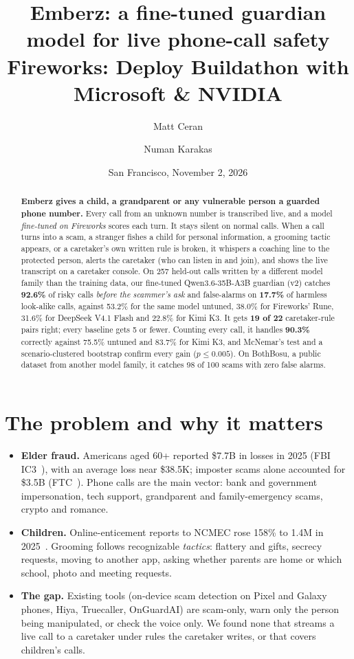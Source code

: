 \documentclass[11pt]{article}
\title{\textbf{Emberz}: a fine-tuned guardian model for live phone-call safety\\[2pt]\large Fireworks: Deploy Buildathon with Microsoft \& NVIDIA}
\author{Matt Ceran \and Numan Karakas}
\date{San Francisco, November 2, 2026}
\newcommand{\num}[1]{\textbf{#1}}
\begin{document}
\maketitle

\begin{abstract}
\noindent \textbf{Emberz gives a child, a grandparent or any vulnerable person a guarded phone number.} Every call from an unknown number is transcribed live, and a model \emph{fine-tuned on Fireworks} scores each turn. It stays silent on normal calls. When a call turns into a scam, a stranger fishes a child for personal information, a grooming tactic appears, or a caretaker's own written rule is broken, it whispers a coaching line to the protected person, alerts the caretaker (who can listen in and join), and shows the live transcript on a caretaker console.
On 257 held-out calls written by a different model family than the training data, our fine-tuned Qwen3.6-35B-A3B guardian (v2) catches \num{92.6\%} of risky calls \emph{before the scammer's ask} and false-alarms on \num{17.7\%} of harmless look-alike calls, against 53.2\% for the same model untuned, 38.0\% for Fireworks' Rune, 31.6\% for DeepSeek V4.1 Flash and 22.8\% for Kimi K3. It gets \num{19 of 22} caretaker-rule pairs right; every baseline gets 5 or fewer. Counting every call, it handles \num{90.3\%} correctly against 75.5\% untuned and 83.7\% for Kimi K3, and McNemar's test and a scenario-clustered bootstrap confirm every gain ($p \le 0.005$). On BothBosu, a public dataset from another model family, it catches 98 of 100 scams with zero false alarms.
\end{abstract}

\section{The problem and why it matters}
\begin{itemize}
\item \textbf{Elder fraud.} Americans aged 60+ reported \$7.7B in losses in 2025 (FBI IC3~\cite{ic3}), with an average loss near \$38.5K; imposter scams alone accounted for \$3.5B (FTC~\cite{ftc}). Phone calls are the main vector: bank and government impersonation, tech support, grandparent and family-emergency scams, crypto and romance.
\item \textbf{Children.} Online-enticement reports to NCMEC rose 158\% to 1.4M in 2025~\cite{ncmec}. Grooming follows recognizable \emph{tactics}: flattery and gifts, secrecy requests, moving to another app, asking whether parents are home or which school, photo and meeting requests.
\item \textbf{The gap.} Existing tools (on-device scam detection on Pixel and Galaxy phones, Hiya, Truecaller, OnGuardAI) are scam-only, warn only the person being manipulated, or check the voice only. We found none that streams a live call to a caretaker under rules the caretaker writes, or that covers children's calls.
\end{itemize}
\end{document}
